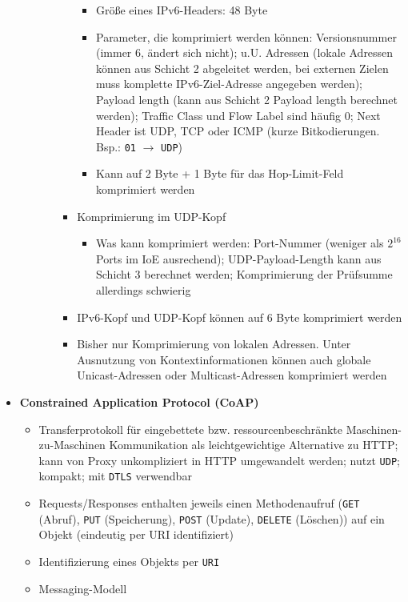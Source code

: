 \begin{itemize}
\begin{itemize}
\begin{itemize}
\begin{itemize}
				\begin{itemize}
					\item Größe eines IPv6-Headers: 48 Byte
					\item Parameter, die komprimiert werden können: Versionsnummer (immer \(6\), ändert sich nicht); u.U. Adressen (lokale Adressen können aus Schicht 2 abgeleitet werden, bei externen Zielen muss komplette IPv6-Ziel-Adresse angegeben werden); Payload length (kann aus Schicht 2 Payload length berechnet werden); Traffic Class und Flow Label sind häufig \(0\); Next Header ist UDP, TCP oder ICMP (kurze Bitkodierungen. Bsp.: \texttt{01} \(\rightarrow\) \texttt{UDP})
					\item Kann auf 2 Byte + 1 Byte für das Hop-Limit-Feld komprimiert werden
				\end{itemize}
				\item Komprimierung im UDP-Kopf
				\begin{itemize}
					\item Was kann komprimiert werden: Port-Nummer (weniger als \(2^{16}\) Ports im IoE ausrechend); UDP-Payload-Length kann aus Schicht 3 berechnet werden; Komprimierung der Prüfsumme allerdings schwierig
				\end{itemize}
				\item IPv6-Kopf und UDP-Kopf können auf 6 Byte komprimiert werden
				\item Bisher nur Komprimierung von lokalen Adressen. Unter Ausnutzung von Kontextinformationen können auch globale Unicast-Adressen oder Multicast-Adressen komprimiert werden
			\end{itemize}
		\end{itemize}
	\end{itemize}
	\item \textbf{Constrained Application Protocol (CoAP)}
	\begin{itemize}
		\item Transferprotokoll für eingebettete bzw. ressourcenbeschränkte Maschinen-zu-Maschinen Kommunikation als leichtgewichtige Alternative zu HTTP; kann von Proxy unkompliziert in HTTP umgewandelt werden; nutzt \texttt{UDP}; kompakt; mit \texttt{DTLS} verwendbar
		\item Requests/Responses enthalten jeweils einen Methodenaufruf (\texttt{GET} (Abruf), \texttt{PUT} (Speicherung), \texttt{POST} (Update), \texttt{DELETE} (Löschen)) auf ein Objekt (eindeutig per URI identifiziert)
		\item Identifizierung eines Objekts per \texttt{URI}
		\item Messaging-Modell

\end{itemize}
\end{itemize}
